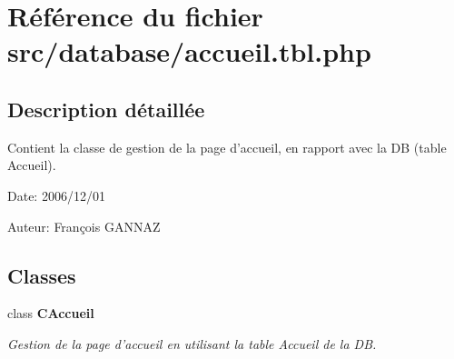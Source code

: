 \section{Référence du fichier src/database/accueil.tbl.php}
\label{accueil_8tbl_8php}


\subsection{Description détaillée}
Contient la classe de gestion de la page d'accueil, en rapport avec la DB (table Accueil). 

\begin{Desc}
\item[Date:]2006/12/01\end{Desc}
\begin{Desc}
\item[Auteur:]François GANNAZ \end{Desc}


\subsection*{Classes}
\begin{CompactItemize}
\item 
class {\bf CAccueil}
\begin{CompactList}\small\item\em Gestion de la page d'accueil en utilisant la table Accueil de la DB. \item\end{CompactList}\end{CompactItemize}
